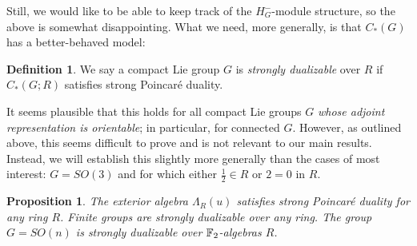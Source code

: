 \documentclass{memo-l}
\newtheorem{proposition}[theorem]{Proposition}
\theoremstyle{definition}
\newtheorem{definition}[theorem]{Definition}
\theoremstyle{remark}
\numberwithin{section}{chapter}
\numberwithin{equation}{chapter}
\begin{document}
Still, we would like to be able to keep track of the $H^-_G$-module structure, so the above is somewhat disappointing. What we need, more generally, is that $C_*(G)$ has a better-behaved model: 

\begin{definition}
We say a compact Lie group $G$ is \emph{strongly dualizable} over $R$ if  $C_*(G;R)$ satisfies strong Poincar\'e duality. 
\end{definition}

It seems plausible that this holds for all compact Lie groups $G$ \emph{whose adjoint representation is orientable}; in particular, for connected $G$. However, as outlined above, this seems difficult to prove and is not relevant to our main results. Instead, we will establish this slightly more generally than the cases of most interest: $G = SO(3)$ and for which either $\frac 12 \in R$ or $2 = 0$ in $R$. 

\begin{proposition}\label{prop:strongduals}
The exterior algebra $\Lambda_R(u)$ satisfies strong Poincar\'e duality for any ring $R$. Finite groups are strongly dualizable over any ring. The group $G = SO(n)$ is strongly dualizable over $\Bbb F_2$-algebras $R$.
\end{proposition}
\end{document}
